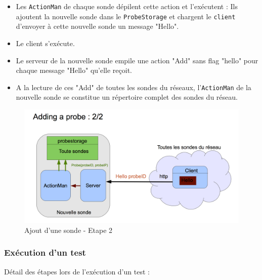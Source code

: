 \documentclass[a4paper,11pt]{article}
\begin{document}
\begin{itemize}
\item Les \texttt{ActionMan} de chaque sonde dépilent cette action et l'exécutent : Ils ajoutent la nouvelle sonde dans le \texttt{ProbeStorage} et chargent le \texttt{client} d'envoyer à cette nouvelle sonde un message "Hello".
\item Le client s'exécute.
\item Le serveur de la nouvelle sonde empile une action "Add" sans flag "hello" pour chaque message "Hello" qu'elle reçoit.
\item A la lecture de ces "Add" de toutes les sondes du réseaux, l'\texttt{ActionMan} de la nouvelle sonde se constitue un répertoire complet des sondes du réseau.
\end{itemize}

\begin{figure}[!ht]
\centering\includegraphics[width=0.6\linewidth]{img/graphAdd2.png}
\caption{Ajout d'une sonde - Etape 2}
\end{figure}

\FloatBarrier



\subsubsection{Exécution d'un test}

Détail des étapes lors de l'exécution d'un test :
\end{document}
